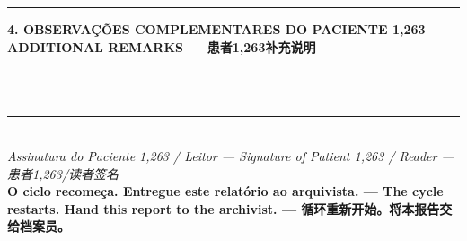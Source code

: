 \vspace{1em}
\noindent\rule{\textwidth}{0.5pt}
\vspace{0.5em}

\noindent\textbf{4. OBSERVAÇÕES COMPLEMENTARES DO PACIENTE 1,263 --- ADDITIONAL REMARKS --- 患者1,263补充说明}

\vspace{0.5em}
\noindent\dotfill\\[0.4em]
\noindent\dotfill\\[0.4em]
\noindent\dotfill

\vspace{1.5em}
\begin{center}
\rule{0.5\textwidth}{0.5pt}\\[0.4em]
\textit{Assinatura do Paciente 1,263 / Leitor --- Signature of Patient 1,263 / Reader --- 患者1,263/读者签名}\\[0.3em]
{\small\textcolor{sangue}{\textbf{O ciclo recomeça. Entregue este relatório ao arquivista. --- The cycle restarts. Hand this report to the archivist. --- 循环重新开始。将本报告交给档案员。}}}
\end{center}

\endgroup
\clearpage
